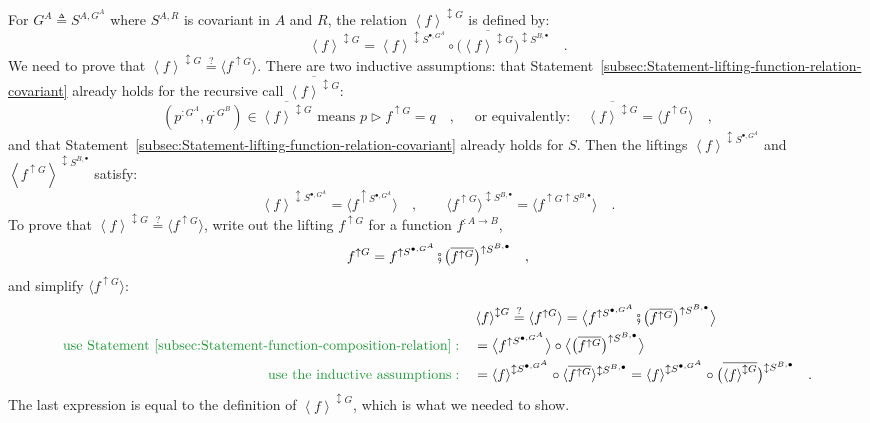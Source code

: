 For $G^{A}\triangleq S^{A,G^{A}}$ where $S^{A,R}$ is covariant in
$A$ and $R$, the relation $\left<f\right>^{\updownarrow G}$ is
defined by:
\[
\left<f\right>^{\updownarrow G}=\left<f\right>^{\updownarrow S^{\bullet,G^{A}}}\circ\big(\overline{\left<f\right>^{\updownarrow G}}\big)^{\updownarrow S^{B,\bullet}}\quad.
\]
We need to prove that $\left<f\right>^{\updownarrow G}\overset{?}{=}\langle f^{\uparrow G}\rangle$.
There are two inductive assumptions: that Statement~\ref{subsec:Statement-lifting-function-relation-covariant}
already holds for the recursive call $\overline{\left<f\right>^{\updownarrow G}}$:
\[
(p^{:G^{A}},q^{:G^{B}})\in\overline{\left<f\right>^{\updownarrow G}}\text{ means }p\triangleright f^{\uparrow G}=q\quad,\quad\text{ or equivalently}:\quad\overline{\left<f\right>^{\updownarrow G}}=\langle f^{\uparrow G}\rangle\quad,
\]
and that Statement~\ref{subsec:Statement-lifting-function-relation-covariant}
already holds for $S$. Then the liftings $\left<f\right>^{\updownarrow S^{\bullet,G^{A}}}$
and $\left<f^{\uparrow G}\right>^{\updownarrow S^{B,\bullet}}$ satisfy:
\[
\left<f\right>^{\updownarrow S^{\bullet,G^{A}}}=\langle f^{\uparrow S^{\bullet,G^{A}}}\rangle\quad,\quad\quad\langle f^{\uparrow G}\rangle^{\updownarrow S^{B,\bullet}}=\langle f^{\uparrow G\uparrow S^{B,\bullet}}\rangle\quad.
\]
To prove that $\left<f\right>^{\updownarrow G}\overset{?}{=}\langle f^{\uparrow G}\rangle$,
write out the lifting $f^{\uparrow G}$ for a function $f^{:A\rightarrow B}$,
\[
f^{\uparrow G}=f^{\uparrow S^{\bullet,G^{A}}}\bef\big(\overline{f^{\uparrow G}}\big)^{\uparrow S^{B,\bullet}}\quad,
\]
and simplify $\langle f^{\uparrow G}\rangle$:
\begin{align*}
 & \left<f\right>^{\updownarrow G}\overset{?}{=}\langle f^{\uparrow G}\rangle=\big\langle f^{\uparrow S^{\bullet,G^{A}}}\bef\big(\overline{f^{\uparrow G}}\big)^{\uparrow S^{B,\bullet}}\big\rangle\\
{\color{greenunder}\text{use Statement~\ref{subsec:Statement-function-composition-relation}}:}\quad & =\big\langle f^{\uparrow S^{\bullet,G^{A}}}\big\rangle\circ\big\langle\big(\overline{f^{\uparrow G}}\big)^{\uparrow S^{B,\bullet}}\big\rangle\\
{\color{greenunder}\text{use the inductive assumptions}:}\quad & =\left<f\right>^{\updownarrow S^{\bullet,G^{A}}}\circ\langle\overline{f^{\uparrow G}}\rangle^{\updownarrow S^{B,\bullet}}=\left<f\right>^{\updownarrow S^{\bullet,G^{A}}}\circ\big(\overline{\left<f\right>^{\updownarrow G}}\big)^{\updownarrow S^{B,\bullet}}\quad.
\end{align*}
The last expression is equal to the definition of $\left<f\right>^{\updownarrow G}$,
which is what we needed to show.

